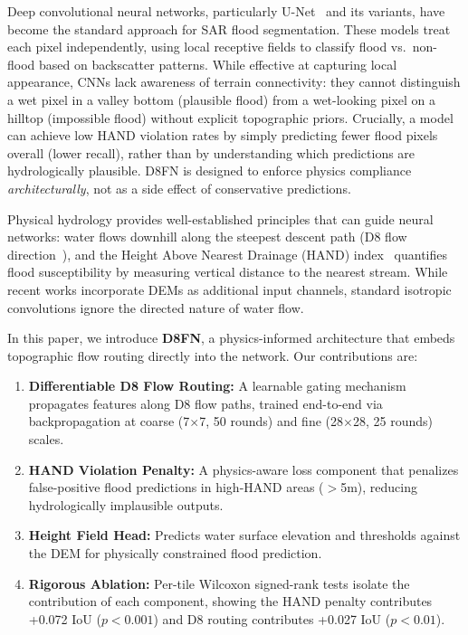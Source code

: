 \documentclass[journal]{IEEEtran}
\begin{document}
Deep convolutional neural networks, particularly U-Net~\cite{unet} and its variants, have become the standard approach for SAR flood segmentation. These models treat each pixel independently, using local receptive fields to classify flood vs.\ non-flood based on backscatter patterns. While effective at capturing local appearance, CNNs lack awareness of terrain connectivity: they cannot distinguish a wet pixel in a valley bottom (plausible flood) from a wet-looking pixel on a hilltop (impossible flood) without explicit topographic priors. Crucially, a model can achieve low HAND violation rates by simply predicting fewer flood pixels overall (lower recall), rather than by understanding which predictions are hydrologically plausible. D8FN is designed to enforce physics compliance \emph{architecturally}, not as a side effect of conservative predictions.

Physical hydrology provides well-established principles that can guide neural networks: water flows downhill along the steepest descent path (D8 flow direction~\cite{d8}), and the Height Above Nearest Drainage (HAND) index~\cite{hand} quantifies flood susceptibility by measuring vertical distance to the nearest stream. While recent works incorporate DEMs as additional input channels, standard isotropic convolutions ignore the directed nature of water flow.

In this paper, we introduce \textbf{D8FN}, a physics-informed architecture that embeds topographic flow routing directly into the network. Our contributions are:

\begin{enumerate}
    \item \textbf{Differentiable D8 Flow Routing:} A learnable gating mechanism propagates features along D8 flow paths, trained end-to-end via backpropagation at coarse (7$\times$7, 50 rounds) and fine (28$\times$28, 25 rounds) scales.
    \item \textbf{HAND Violation Penalty:} A physics-aware loss component that penalizes false-positive flood predictions in high-HAND areas ($>$5m), reducing hydrologically implausible outputs.
    \item \textbf{Height Field Head:} Predicts water surface elevation and thresholds against the DEM for physically constrained flood prediction.
    \item \textbf{Rigorous Ablation:} Per-tile Wilcoxon signed-rank tests isolate the contribution of each component, showing the HAND penalty contributes +0.072 IoU ($p < 0.001$) and D8 routing contributes +0.027 IoU ($p < 0.01$).
\end{enumerate}
\end{document}

